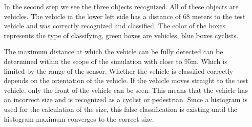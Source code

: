 \documentclass[11pt,oneside,openright]{mpreport}
\begin{document}

In the second step we see the three objects recognized. All of these objects are vehicles. The vehicle in the lower left side has a distance of 68 meters to the test vehicle and 
was correctly recognized and classified. The color of the boxes represents the type of classifying, green boxes are vehicles, blue boxes cyclists.


The maximum distance at which the vehicle can be fully detected can be determined within the scope of the simulation with close to 95m.
Which is limited by the range of the sensor. Whether the vehicle is classified correctly depends on the orientation of the vehicle. 
If the vehicle moves straight to the test vehicle, only the front of the vehicle can be seen. This means that the vehicle has an incorrect size and is recognized as a cyclist or pedestrian. 
Since a histogram is used for the calculation of the size, this false classification is existing until the histogram maximum converges to the correct size.

\end{document}
